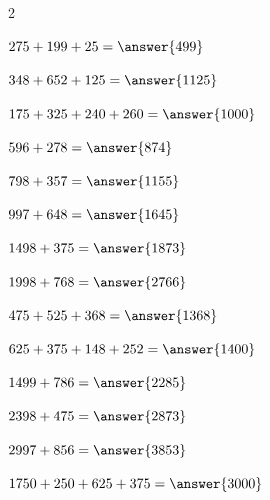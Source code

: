 \documentclass{ximera}
\begin{document}
\begin{oefening}{\oefU\ESS}
\begin{multicols}{2}
    \begin{question} \(275+199+25=\answer{499}\) \end{question}
    
    \begin{question} \(348+652+125=\answer{1125}\) \end{question}
    
    \begin{question} \(175+325+240+260=\answer{1000}\) \end{question}
    
    \begin{question} \(596+278=\answer{874}\) \end{question}
    
    \begin{question} \(798+357=\answer{1155}\) \end{question}
    
    \begin{question} \(997+648=\answer{1645}\) \end{question}
    
    \begin{question} \(1498+375=\answer{1873}\) \end{question}
    
    \begin{question} \(1998+768=\answer{2766}\) \end{question}
    
    \begin{question} \(475+525+368=\answer{1368}\) \end{question}
    
    \begin{question} \(625+375+148+252=\answer{1400}\) \end{question}
    
    \begin{question} \(1499+786=\answer{2285}\) \end{question}
    
    \begin{question} \(2398+475=\answer{2873}\) \end{question}
    
    \begin{question} \(2997+856=\answer{3853}\) \end{question}
    
    \begin{question} \(1750+250+625+375=\answer{3000}\) \end{question}
    

\end{multicols}
\end{oefening}
\end{document}
